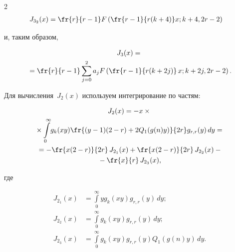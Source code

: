 \begin{multicols}{2}
\begin{align*}
J_{3_2}(x)&=\fr{r}{r-1} F\left( \fr{r-1}{r(k+4)}x;k+4,2r-2\right)


\end{align*}


и, таким образом,


\begin{multline}


J_3(x)={}\\


\!\!{}=\fr{r}{r-1}  \sum\limits_{j=0}^{2} a_j  F\left( \fr{r-1}{r(k+2j)} \,x;k+2j,2r-2\right).\!\!


\label{int3}


\end{multline}








Для вычисления~$J_2(x)$ используем интегрирование по частям:


\begin{multline}


\label{j2}


J_2(x) =- x\times{}\\


{}\times 


\int\limits^{\infty}_{0}\! g_k(xy)  \fr{(y - 1)(2 - r) + 2 


Q_1(g(n)y)}{2 r}g_{r,r}(y)\, dy = {}\\


{}= - \fr{x(2-r)}{2r}\, J_{2_1}(x) +  \fr{x(2-r)}{2r}\, J_{2_2}(x) -{}\\


{}- \fr{x}{r}\,J_{2_3}(x),


 \end{multline}


 где


 \begin{align*}


 J_{2_1}(x) &= \int\limits^{\infty}_{0}y g_k(xy)g_{r,r}(y)\, dy; \\ 


J_{2_2}(x) &= \int\limits^{\infty}_{0} g_k(xy)g_{r,r}(y) \,dy; \\


J_{2_3}(x) &= \int\limits^{\infty}_{0} g_k(xy)g_{r,r}(y)Q_1(g(n)y) \,dy.


 \end{align*}









\end{multicols}
